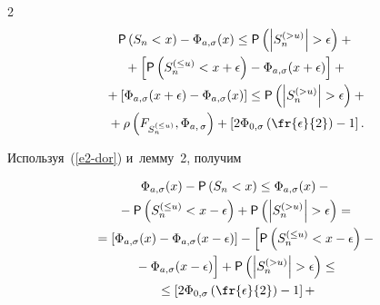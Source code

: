 \begin{multicols}{2}
\begin{multline}

{\sf P}\left(S_n<x\right)-\Phi_{a,\sigma}(x)\le 

{\sf P}\left(\left\vert S_n^{(>u)}\right\vert>\epsilon\right)+{}\\

{}+

\left[{\sf P}\left(S_n^{(\le u)}<x+\epsilon\right)-\Phi_{a,\sigma}(x+\epsilon)\right]+{}

\\

{}+\left[\Phi_{a,\sigma}(x+\epsilon)-\Phi_{a,\sigma}(x)\right]\le

{\sf P}\left(\left\vert S_n^{(>u)}\right\vert >\epsilon\right)+{}\\

{}+

\rho\left(F_{S_n^{(\le u)}},\Phi_{a,\,\sigma}\right)+

\left[2\Phi_{0,\sigma}\left({\fr{\epsilon}{2}}\right)-1\right].

\label{e5-dor}

\end{multline}

Используя~(\ref{e2-dor}) и~лемму~2, получим

\begin{multline}

\Phi_{a,\sigma}(x)-{\sf P}\left(S_n<x\right)\le 

\Phi_{a,\sigma}(x)-{}\\

{}-{\sf P}\left(S_n^{(\le u)}<x-\epsilon\right)+{\sf P}\left(\left\vert S_n^{(>u)}\right\vert

>\epsilon\right)={}

\\

{}=\left[\Phi_{a,\sigma}(x)-\Phi_{a,\sigma}(x-\epsilon)\right]-

\left[{\sf P}\left(S_n^{(\le u)}<x-\epsilon\right)-{}\right.\\

\left.{}-\Phi_{a,\sigma}(x-\epsilon)

\vphantom{\left(S_n^{(\le u)}<x-\epsilon\right)}

\right]+ 

{\sf P}\left(\left\vert S_n^{(>u)}\right\vert>\epsilon\right) \le

{}\\

{}\le\left[2\Phi_{0,\sigma}\left({\fr{\epsilon}{2}}\right)-1\right]+


\end{multline}
\end{multicols}
